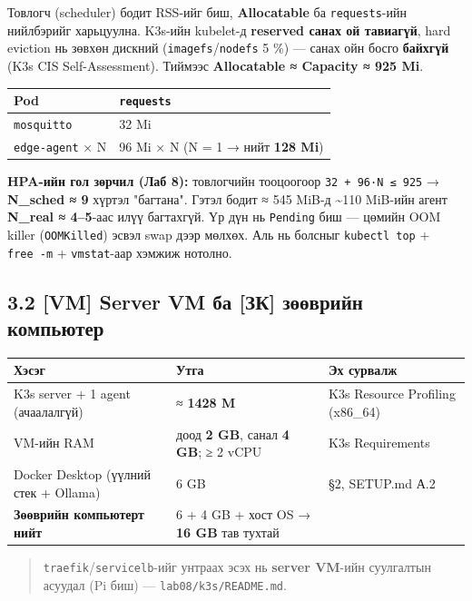 Товлогч (scheduler) бодит RSS-ийг биш, \textbf{Allocatable} ба \texttt{requests}-ийн нийлбэрийг харьцуулна. K3s-ийн kubelet-д \textbf{reserved санах ой тавиагүй}, hard eviction нь зөвхөн дискний (\texttt{imagefs}/\allowbreak\texttt{nodefs} 5 \%) --- санах ойн босго \textbf{байхгүй} (K3s CIS Self-Assessment). Тиймээс \textbf{Allocatable ≈ Capacity ≈ 925 Mi}.

\begingroup\scriptsize\begin{longtable}[]{@{}ll@{}}
\toprule
Pod & \texttt{requests}\tabularnewline
\midrule
\endhead
\texttt{mosquitto} & 32 Mi\tabularnewline
\texttt{edge-agent} × N & 96 Mi × N (N = 1 → нийт \textbf{128 Mi})\tabularnewline
\bottomrule
\end{longtable}\endgroup

\textbf{HPA-ийн гол зөрчил (Лаб 8):} товлогчийн тооцоогоор \texttt{32\ +\ 96·N\ ≤\ 925} → \textbf{N\_sched ≈ 9} хүртэл "багтана". Гэтэл бодит ≈ 545 MiB-д \textasciitilde110 MiB-ийн агент \textbf{N\_real ≈ 4--5}-аас илүү багтахгүй. Үр дүн нь \texttt{Pending} биш --- цөмийн OOM killer (\texttt{OOMKilled}) эсвэл swap дээр мөлхөх. Аль нь болсныг \texttt{kubectl\ top} + \texttt{free\ -m} + \texttt{vmstat}-аар хэмжиж нотолно.

\hypertarget{vm-server-vm-ux431ux430-ux437ux43a-ux437ux4e9ux4e9ux432ux440ux438ux439ux43d-ux43aux43eux43cux43fux44cux44eux442ux435ux440}{%
\subsection{3.2 {[}VM{]} Server VM ба {[}ЗК{]} зөөврийн компьютер}\label{vm-server-vm-ux431ux430-ux437ux43a-ux437ux4e9ux4e9ux432ux440ux438ux439ux43d-ux43aux43eux43cux43fux44cux44eux442ux435ux440}}

\begingroup\scriptsize\begin{longtable}[]{@{}lll@{}}
\toprule
Хэсэг & Утга & Эх сурвалж\tabularnewline
\midrule
\endhead
K3s server + 1 agent (ачаалалгүй) & ≈ \textbf{1428 M} & K3s Resource Profiling (x86\_64)\tabularnewline
VM-ийн RAM & доод \textbf{2 GB}, санал \textbf{4 GB}; ≥ 2 vCPU & K3s Requirements\tabularnewline
Docker Desktop (үүлний стек + Ollama) & 6 GB & §2, SETUP.md А.2\tabularnewline
\textbf{Зөөврийн компьютерт нийт} & 6 + 4 GB + хост OS → \textbf{16 GB} тав тухтай &\tabularnewline
\bottomrule
\end{longtable}\endgroup

\begin{quote}
\texttt{traefik}/\allowbreak\texttt{servicelb}-ийг унтраах эсэх нь \textbf{server VM}-ийн суулгалтын асуудал (Pi биш) --- \texttt{lab08/\allowbreak{}k3s/\allowbreak{}README.\allowbreak{}md}.
\end{quote}

